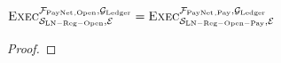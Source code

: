 \begin{lemma}
  \label{lemma:pay}
  $\textsc{Exec}^{\mathcal{F}_{\mathrm{PayNet}}{}_{\mathrm{, Open}},
  \mathcal{G}_{\mathrm{Ledger}}}_{\mathcal{S}_{\mathrm{LN - Reg - Open}}, \mathcal{E}} =
  \textsc{Exec}^{\mathcal{F}_{\mathrm{PayNet}}{}_{\mathrm{, Pay}}, \mathcal{G}_{\mathrm{Ledger}}}_{\mathcal{S}_{\mathrm{LN
  - Reg - Open - Pay}}, \mathcal{E}}$
\end{lemma}

\begin{proof}
\end{proof}
